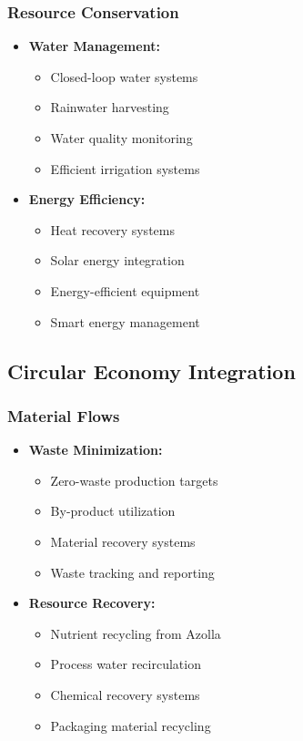 \subsubsection{Resource Conservation}
\begin{itemize}
    \item \textbf{Water Management:}
    \begin{itemize}
        \item Closed-loop water systems
        \item Rainwater harvesting
        \item Water quality monitoring
        \item Efficient irrigation systems
    \end{itemize}
    
    \item \textbf{Energy Efficiency:}
    \begin{itemize}
        \item Heat recovery systems
        \item Solar energy integration
        \item Energy-efficient equipment
        \item Smart energy management
    \end{itemize}
\end{itemize}

\subsection{Circular Economy Integration}

\subsubsection{Material Flows}
\begin{itemize}
    \item \textbf{Waste Minimization:}
    \begin{itemize}
        \item Zero-waste production targets
        \item By-product utilization
        \item Material recovery systems
        \item Waste tracking and reporting
    \end{itemize}
    
    \item \textbf{Resource Recovery:}
    \begin{itemize}
        \item Nutrient recycling from Azolla
        \item Process water recirculation
        \item Chemical recovery systems
        \item Packaging material recycling
    \end{itemize}
\end{itemize}

